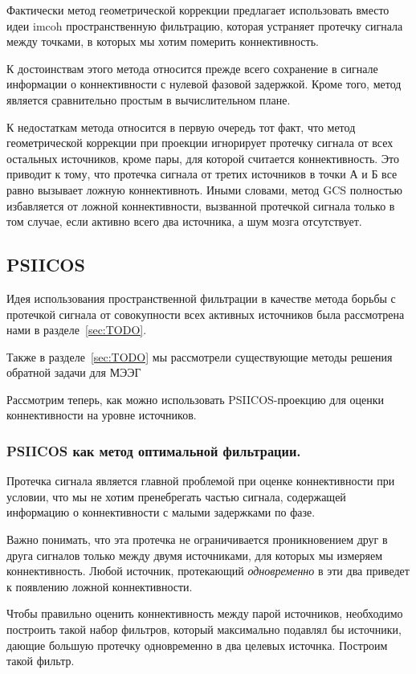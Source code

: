 Фактически метод геометрической коррекции предлагает использовать вместо идеи
imcoh пространственную фильтрацию, которая устраняет протечку сигнала между
точками, в которых мы хотим померить коннективность.

К достоинствам этого метода относится прежде всего сохранение в сигнале
информации о коннективности с нулевой фазовой задержкой. Кроме того, метод
является сравнительно простым в вычислительном плане.

К недостаткам метода относится в первую очередь тот факт, что метод
геометрической коррекции при проекции игнорирует протечку сигнала от всех
остальных источников, кроме пары, для которой считается коннективность. Это
приводит к тому, что протечка сигнала от третих источников в точки А и Б все
равно вызывает ложную коннективноть.  Иными словами, метод GCS полностью
избавляется от ложной коннективности, вызванной протечкой сигнала только в том
случае, если активно всего два источника, а шум мозга отсутствует.

\subsection{PSIICOS}
Идея использования пространственной фильтрации в качестве метода борьбы с
протечкой сигнала от совокупности всех активных источников была рассмотрена
нами в разделе~\ref{sec:TODO}.

Также в разделе~\ref{sec:TODO} мы рассмотрели существующие методы решения
обратной задачи для МЭЭГ

Рассмотрим теперь, как можно использовать PSIICOS-проекцию для оценки
коннективности на уровне источников.

\subsubsection{PSIICOS как метод оптимальной фильтрации.}

Протечка сигнала является главной проблемой при оценке коннективности при
условии, что мы не хотим пренебрегать частью сигнала, содержащей информацию
о коннективности с малыми задержками по фазе.

Важно понимать, что эта протечка не ограничивается проникновением друг в друга
сигналов только между двумя источниками, для которых мы измеряем
коннективность. Любой источник, протекающий \emph{одновременно} в эти два приведет
к появлению ложной коннективности.

Чтобы правильно оценить коннективность между парой источников,
необходимо построить такой набор фильтров, который максимально
подавлял бы источники, дающие большую протечку одновременно в два
целевых источнка. Построим такой фильтр.

